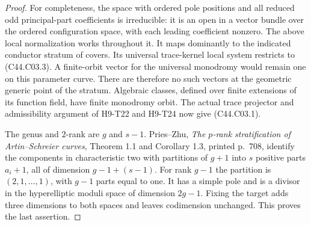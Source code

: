 \documentclass[11pt]{article}
\theoremstyle{remark}\newtheorem{remark}[theorem]{Remark}
\begin{document}
\begin{proof}
For completeness, the space with ordered pole positions and all
reduced odd principal-part coefficients is irreducible: it is an open
in a vector bundle over the ordered configuration space, with each
leading coefficient nonzero. The above local normalization works
throughout it. It maps dominantly to the indicated conductor stratum
of covers. Its universal trace-kernel local system restricts to
(C44.C03.3). A finite-orbit vector for the universal monodromy would
remain one on this parameter curve. There are therefore no such
vectors at the geometric generic point of the stratum. Algebraic
classes, defined over finite extensions of its function field, have
finite monodromy orbit. The actual trace projector and admissibility
argument of H9-T22 and H9-T24 now give (C44.C03.1).

The genus and $2$-rank are $g$ and $s-1$. Pries--Zhu,
\emph{The $p$-rank stratification of Artin--Schreier curves},
Theorem 1.1 and Corollary 1.3, printed p.~708, identify the components
in characteristic two with partitions of $g+1$ into $s$ positive
parts $a_i+1$, all of dimension $g-1+(s-1)$. For rank $g-1$ the
partition is $(2,1,\ldots,1)$, with $g-1$ parts equal to one.
It has a simple pole and is a divisor in the hyperelliptic moduli
space of dimension $2g-1$. Fixing the target adds three dimensions
to both spaces and leaves codimension unchanged. This proves the
last assertion.
\end{proof}
\end{document}

